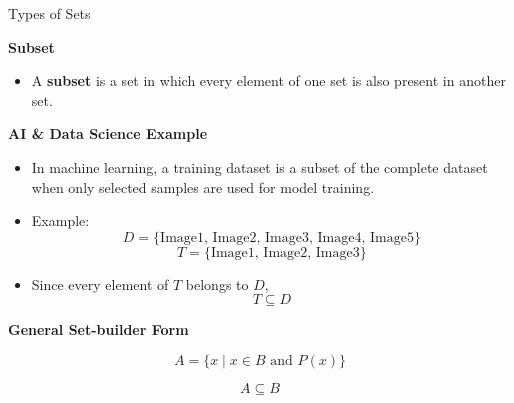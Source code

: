 \documentclass{beamer}
\begin{document}
\begin{frame}{Types of Sets}

\textbf{Subset}

\begin{itemize}
    \item A \textbf{subset} is a set in which every element of one set is also present in another set.
\end{itemize}

\vspace{0.3cm}

\textbf{AI \& Data Science Example}

\begin{itemize}
    \item In machine learning, a training dataset is a subset of the complete dataset when only selected samples are used for model training.
    \item Example:
    \[
    D=\{\text{Image1, Image2, Image3, Image4, Image5}\}
    \]
    \[
    T=\{\text{Image1, Image2, Image3}\}
    \]
    \item Since every element of \(T\) belongs to \(D\),
    \[
    T\subseteq D
    \]
\end{itemize}

\vspace{0.3cm}

\textbf{General Set-builder Form}

\[
A=\{x \mid x\in B \text{ and } P(x)\}
\]

\[
A\subseteq B
\]

\end{frame}
\end{document}
